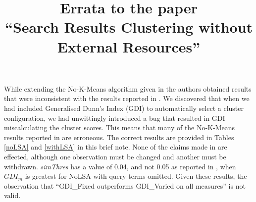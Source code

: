 \documentclass[a4paper, conference]{IEEEtran}
\begin{document}
%


\title{Errata to the paper \\``Search Results Clustering without External Resources''}
%
%
\author{
}


\maketitle              %

While extending the No-K-Means algorithm given in \cite{Staff:2015eu} the authors obtained results that were inconsistent with the results reported in \cite{Staff:2015eu}. We discovered that when we had included Generalised Dunn's Index (GDI) to automatically select a cluster configuration, we had unwittingly introduced a bug that resulted in GDI miscalculating the cluster scores. This means that many of the No-K-Means results reported in \cite{Staff:2015eu} are erroneous. The correct results are provided in Tables \ref{noLSA} and \ref{withLSA} in this brief note. None of the claims made in \cite{Staff:2015eu} are effected, although one observation must be changed and another must be withdrawn. \textit{simThres} has a value of 0.04, and not 0.05 as reported in \cite{Staff:2015eu}, when $GDI_m$ is greatest for NoLSA with query terms omitted. Given these results, the observation that ``GDI\_Fixed outperforms GDI\_Varied on all measures'' \cite{Staff:2015eu} is not valid. 


\end{document}
